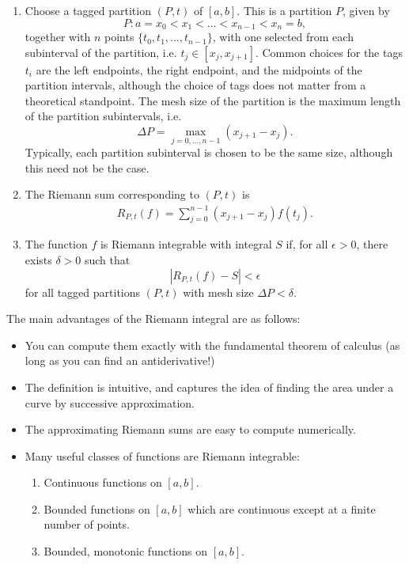 \documentclass[12pt]{amsart}         %
\theoremstyle{remark}
\begin{document}
\begin{enumerate}
    \item Choose a tagged partition $(P, t)$ of $[a, b]$. This is a partition $P$, given by
    \[
    P: a = x_0 < x_1 < \dots < x_{n-1} < x_n = b,
    \]
    together with $n$ points $\{ t_0, t_1, \dots, t_{n-1} \}$, with one selected from each subinterval of the partition, i.e. $t_j \in [x_j, x_{j+1}]$. Common choices for the tags $t_i$ are the left endpoints, the right endpoint, and the midpoints of the partition intervals, although the choice of tags does not matter from a theoretical standpoint. The mesh size of the partition is the maximum length of the partition subintervals, i.e.
    \[
    \Delta P = \max_{j = 0, \dots, n-1}(x_{j+1} - x_j).
    \]
    Typically, each partition subinterval is chosen to be the same size, although this need not be the case.
    \item The Riemann sum corresponding to $(P, t)$ is    
    \begin{align*}
        R_{P,t}(f) = \sum_{j = 0}^{n-1} (x_{j+1} - x_j) f(t_j).
    \end{align*}
    \item The function $f$ is Riemann integrable with integral $S$ if, for all $\epsilon > 0$, there exists $\delta > 0$ such that
    \[
    |R_{P, t}(f) - S| < \epsilon
    \]
    for all tagged partitions $(P, t)$ with mesh size $\Delta P < \delta$. 
\end{enumerate}

The main advantages of the Riemann integral are as follows:

\begin{itemize}
    \item You can compute them exactly with the fundamental theorem of calculus (as long as you can find an antiderivative!)
    \item The definition is intuitive, and captures the idea of finding the area under a curve by successive approximation.
    \item The approximating Riemann sums are easy to compute numerically.
    \item Many useful classes of functions are Riemann integrable:
    \begin{enumerate}
        \item Continuous functions on $[a, b]$.
        \item Bounded functions on $[a, b]$ which are continuous except at a finite number of points.
        \item Bounded, monotonic functions on $[a,b]$.
    \end{enumerate}
\end{itemize}
\end{document}
